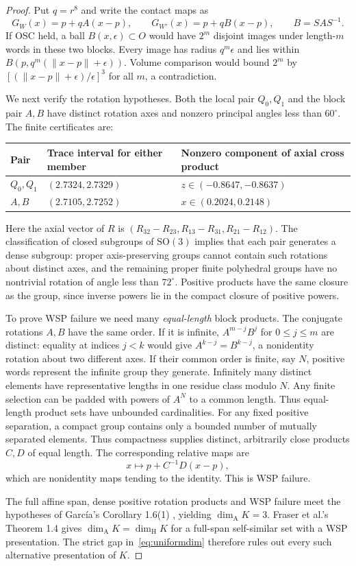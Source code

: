 \documentclass[11pt,a4paper]{article}
\theoremstyle{definition}\newtheorem{definition}[theorem]{Definition}
\theoremstyle{remark}\newtheorem{remark}[theorem]{Remark}
\newcommand{\dimH}{\dim_{\mathrm H}}\newcommand{\dimA}{\dim_{\mathrm A}}
\newcommand{\SO}{\mathrm{SO}}\newcommand{\lk}{\operatorname{lk}}
\begin{document}
\begin{proof}
Put $q=r^8$ and write the contact maps as
\[
G_W(x)=p+qA(x-p),\qquad G_{W'}(x)=p+qB(x-p),\qquad B=SAS^{-1}.
\]
If OSC held, a ball $B(x,\epsilon)\subset O$ would have $2^m$ disjoint images
under length-$m$ words in these two blocks. Every image has radius
$q^m\epsilon$ and lies within $B(p,q^m(\|x-p\|+\epsilon))$.
Volume comparison would bound $2^m$ by
$[(\|x-p\|+\epsilon)/\epsilon]^3$ for all $m$, a contradiction.

We next verify the rotation hypotheses. Both the local pair $Q_0,Q_1$ and
the block pair $A,B$ have distinct rotation axes and nonzero principal angles
less than $60^\circ$. The finite certificates are:
\begin{center}\small
\begin{tabular}{lll}\toprule
Pair & Trace interval for either member & Nonzero component of axial cross product\\\midrule
$Q_0,Q_1$ & $(2.7324,2.7329)$ & $z\in(-0.8647,-0.8637)$\\
$A,B$ & $(2.7105,2.7252)$ & $x\in(0.2024,0.2148)$\\\bottomrule
\end{tabular}
\end{center}
Here the axial vector of $R$ is
$(R_{32}-R_{23},R_{13}-R_{31},R_{21}-R_{12})$.
The classification of closed subgroups of $\SO(3)$ \cite[Section 3]{olive}
implies that each pair generates a dense subgroup: proper axis-preserving
groups cannot contain such rotations about distinct axes, and the remaining
proper finite polyhedral groups have no nontrivial rotation of angle less
than $72^\circ$. Positive products have the same closure as the group,
since inverse powers lie in the compact closure of positive powers.

To prove WSP failure we need many \emph{equal-length} block products.
The conjugate rotations $A,B$ have the same order. If it is infinite,
$A^{m-j}B^j$ for $0\le j\le m$ are distinct: equality at indices $j<k$
would give $A^{k-j}=B^{k-j}$, a nonidentity rotation about two different
axes. If their common order is finite, say $N$,
positive words represent the infinite group they generate. Infinitely many
distinct elements have representative lengths in one residue class modulo
$N$. Any finite selection can be padded with powers of $A^N$ to a common
length. Thus equal-length product sets have unbounded cardinalities.
For any fixed positive separation, a compact group contains only a bounded
number of mutually separated elements. Thus compactness supplies distinct,
arbitrarily close products $C,D$ of equal length. The corresponding relative maps are
\[
x\longmapsto p+C^{-1}D(x-p),
\]
which are nonidentity maps tending to the identity. This is WSP failure.

The full affine span, dense positive rotation products and WSP failure meet
the hypotheses of Garc\'ia's Corollary 1.6(1) \cite{garcia}, yielding
$\dimA K=3$. Fraser et al.'s Theorem 1.4 \cite{fhor} gives
$\dimA K=\dimH K$ for a full-span self-similar set with a WSP presentation.
The strict gap in~\eqref{eq:uniformdim} therefore rules out every such
alternative presentation of $K$.
\end{proof}
\end{document}
